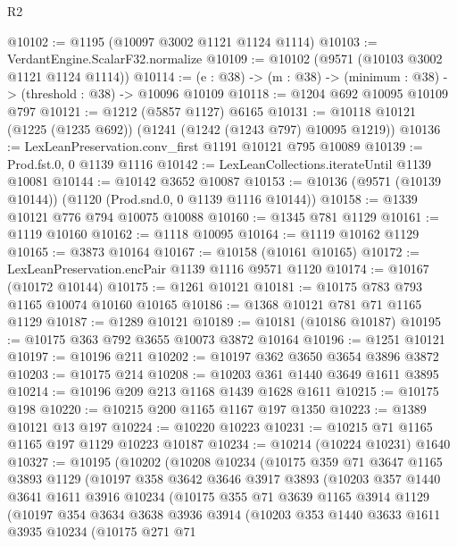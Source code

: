 \begin{lexlean}{R2}
\begin{coremodule}
@10102 := @1195 (@10097 @3002 @1121 @1124 @1114)
@10103 := VerdantEngine.ScalarF32.normalize
@10109 := @10102 (@9571 (@10103 @3002 @1121 @1124 @1114))
@10114 := (e : @38) -> (m : @38) -> (minimum : @38) -> (threshold : @38) -> @10096 @10109
@10118 := @1204 @692 @10095 @10109 @797
@10121 := @1212 (@5857 @1127) @6165
@10131 := @10118 @10121 (@1225 (@1235 @692)) (@1241 (@1242 (@1243 @797) @10095 @1219))
@10136 := LexLeanPreservation.conv_first @1191 @10121 @795 @10089
@10139 := Prod.fst.{0, 0} @1139 @1116
@10142 := LexLeanCollections.iterateUntil @1139 @10081
@10144 := @10142 @3652 @10087
@10153 := @10136 (@9571 (@10139 @10144)) (@1120 (Prod.snd.{0, 0} @1139 @1116 @10144))
@10158 := @1339 @10121 @776 @794 @10075 @10088
@10160 := @1345 @781 @1129
@10161 := @1119 @10160
@10162 := @1118 @10095
@10164 := @1119 @10162 @1129
@10165 := @3873 @10164
@10167 := @10158 (@10161 @10165)
@10172 := LexLeanPreservation.encPair @1139 @1116 @9571 @1120
@10174 := @10167 (@10172 @10144)
@10175 := @1261 @10121
@10181 := @10175 @783 @793 @1165 @10074 @10160 @10165
@10186 := @1368 @10121 @781 @71 @1165 @1129
@10187 := @1289 @10121
@10189 := @10181 (@10186 @10187)
@10195 := @10175 @363 @792 @3655 @10073 @3872 @10164
@10196 := @1251 @10121
@10197 := @10196 @211
@10202 := @10197 @362 @3650 @3654 @3896 @3872
@10203 := @10175 @214
@10208 := @10203 @361 @1440 @3649 @1611 @3895
@10214 := @10196 @209 @213 @1168 @1439 @1628 @1611
@10215 := @10175 @198
@10220 := @10215 @200 @1165 @1167 @197 @1350
@10223 := @1389 @10121 @13 @197
@10224 := @10220 @10223
@10231 := @10215 @71 @1165 @1165 @197 @1129 @10223 @10187
@10234 := @10214 (@10224 @10231) @1640
@10327 := @10195
    (@10202
      (@10208
        @10234
        (@10175
          @359
          @71
          @3647
          @1165
          @3893
          @1129
          (@10197
            @358
            @3642
            @3646
            @3917
            @3893
            (@10203
              @357
              @1440
              @3641
              @1611
              @3916
              @10234
              (@10175
                @355
                @71
                @3639
                @1165
                @3914
                @1129
                (@10197
                  @354
                  @3634
                  @3638
                  @3936
                  @3914
                  (@10203
                    @353
                    @1440
                    @3633
                    @1611
                    @3935
                    @10234
                    (@10175
                      @271
                      @71

\end{coremodule}
\end{lexlean}
